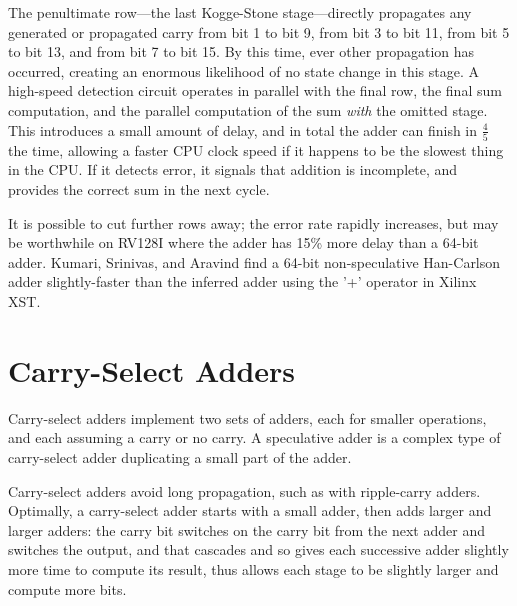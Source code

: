 The penultimate row—the last Kogge-Stone stage—directly propagates any
generated or propagated carry from bit 1 to bit 9, from bit 3 to bit 11, from
bit 5 to bit 13, and from bit 7 to bit 15.  By this time, ever other
propagation has occurred, creating an enormous likelihood of no state change in
this stage.  A high-speed detection circuit operates in parallel with the final
row, the final sum computation, and the parallel computation of the sum {\em
with} the omitted stage.  This introduces a small amount of delay, and in total
the adder can finish in $\frac{4}{5}$ the time, allowing a faster CPU clock
speed if it happens to be the slowest thing in the CPU.  If it detects error,
it signals that addition is incomplete, and provides the correct sum in the
next cycle.

It is possible to cut further rows away; the error rate rapidly increases, but
may be worthwhile on RV128I where the adder has 15\% more delay than a 64-bit
adder.  Kumari, Srinivas, and Aravind find a 64-bit non-speculative Han-Carlson
adder slightly-faster than the inferred adder using the '+' operator in Xilinx
XST.

\section{Carry-Select Adders}

Carry-select adders implement two sets of adders, each for smaller operations,
and each assuming a carry or no carry.  A speculative adder is a complex type
of carry-select adder duplicating a small part of the adder.

Carry-select adders avoid long propagation, such as with ripple-carry adders.
Optimally, a carry-select adder starts with a small adder, then adds larger and
larger adders:  the carry bit switches on the carry bit from the next adder and
switches the output, and that cascades and so gives each successive adder
slightly more time to compute its result, thus allows each stage to be slightly
larger and compute more bits.
